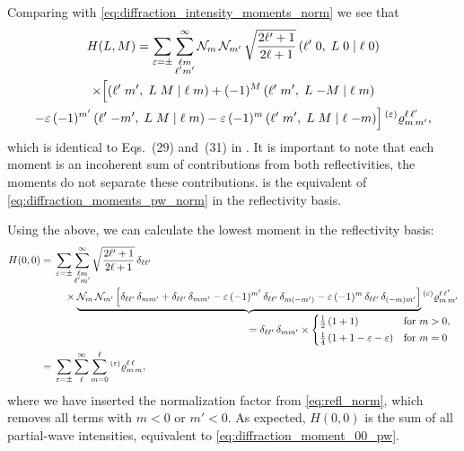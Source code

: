 Comparing with \cref{eq:diffraction_intensity_moments_norm} we see
that
\begin{multline}
  \label{eq:diffraction_moments_pw_refl_norm}
  H(L, M)
  = \sum_{\varepsilon = \pm} \sum_{\substack{\ell m \\ \ell' m'}}^\infty
  \mathcal{N}_m\, \mathcal{N}_{m'}\,
  \sqrt{\frac{2 \ell' + 1}{2 \ell + 1}}\,
  ({\ell'}\;{0},\;{L}\;{0}\; |\; {\ell}\;{0}) \\
  \times \Big[
    ({\ell'}\;{m'},\;{L}\;{M}\; |\; {\ell}\;{m})
    + (-1)^M\, ({\ell'}\;{m'},\;{L}\;{-M}\; |\; {\ell}\;{m}) \\
    - \varepsilon\, (-1)^{m'}\, ({\ell'}\;{-m'},\;{L}\;{M}\; |\; {\ell}\;{m})
    - \varepsilon\, (-1)^m\, ({\ell'}\;{m'},\;{L}\;{M}\; |\; {\ell}\;{-m}) \Big]
  \prescript{(\ensuremath{\varepsilon})}{}{\varrho}^{\ell\, \ell'}_{m\, m'},
\end{multline}
which is identical to Eqs.~(29) and~(31) in .
It is important to note that each moment is an incoherent sum of
contributions from both reflectivities, \ie the moments do not
separate these contributions.
 is the equivalent of
\cref{eq:diffraction_moments_pw_norm} in the reflectivity basis.

Using the above, we can calculate the lowest moment in the
reflectivity basis:
\begin{align}
  H(0, 0)
  ={}& \begin{multlined}[t]
    \sum_{\refl = \pm} \sum_{\substack{\ell m \\ \ell' m'}}^\infty
    \sqrt{\frac{2 \ell' + 1}{2 \ell + 1}}\,
    \delta_{\ell \ell'}
    \\
    \times \rdUnderbrace{\mathcal{N}_m\, \mathcal{N}_{m'} \sBrk[2]{%
      \delta_{\ell \ell'}\, \delta_{m m'}
      + \delta_{\ell \ell'}\, \delta_{m m'}
      - \refl\, (-1)^{m'}\, \delta_{\ell \ell'}\, \delta_{m (-m')}
      - \refl\, (-1)^m\, \delta_{\ell \ell'}\, \delta_{(-m) m'}}}%
      {= \delta_{\ell \ell'}\, \delta_{m m'} \times
      \begin{cases*}
        \frac{1}{2}\, (1 + 1)                 & for $m > 0$, \\
        \frac{1}{4}\, (1 + 1 - \refl - \refl) & for $m = 0$
      \end{cases*}}
    \prescript{(\refl)}{}{\varrho}^{\ell\, \ell'}_{m\, m'}
  \end{multlined} \notag
  \\
  \label{eq:diffraction_moment_00_pw_refl}
  ={}& \sum_{\refl = \pm} \sum_\ell^\infty \sum_{m = 0}^\ell \prescript{(\refl)}{}{\varrho}^{\ell\, \ell}_{m\, m},
\end{align}
where we have inserted the normalization factor from
\cref{eq:refl_norm}, which removes all terms with $m < 0$ or $m' < 0$.
As expected, $H(0, 0)$ is the sum of all partial-wave intensities,
equivalent to \cref{eq:diffraction_moment_00_pw}.


